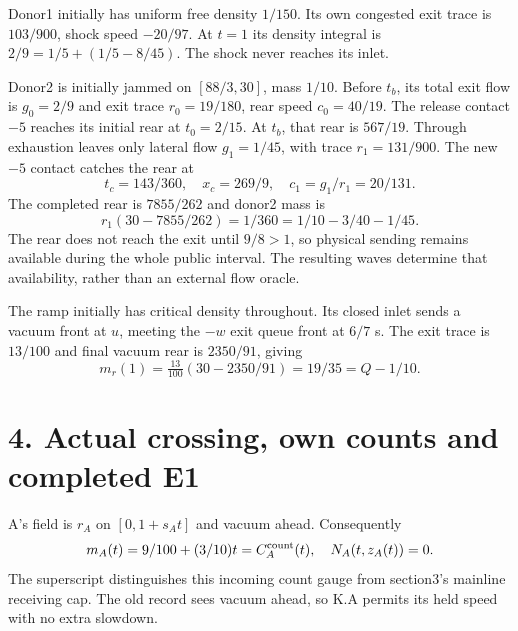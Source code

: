 \documentclass[11pt,a4paper]{article}
\begin{document}
Donor1 initially has uniform free density $1/150$. Its own congested exit
trace is $103/900$, shock speed $-20/97$. At $t=1$ its density integral is
$2/9=1/5+(1/5-8/45)$. The shock never reaches its inlet.

Donor2 is initially jammed on $[88/3,30]$, mass $1/10$. Before $t_b$, its
total exit flow is $g_0=2/9$ and exit trace $r_0=19/180$, rear speed
$c_0=40/19$. The release contact $-5$ reaches its initial rear at $t_0=2/15$.
At $t_b$, that rear is $567/19$. Through exhaustion leaves only lateral flow
$g_1=1/45$, with trace $r_1=131/900$. The new $-5$ contact catches the rear at
\begin{equation}
 t_c=143/360,\quad x_c=269/9,\quad c_1=g_1/r_1=20/131.
\end{equation}
The completed rear is $7855/262$ and donor2 mass is
\begin{equation}
 r_1(30-7855/262)=1/360=1/10-3/40-1/45.
\end{equation}
The rear does not reach the exit until $9/8>1$, so physical sending remains
available during the whole public interval. The resulting waves determine
that availability, rather than an external flow oracle.

The ramp initially has critical density throughout. Its closed inlet sends
a vacuum front at $u$, meeting the $-w$ exit queue front at $6/7$ s. The exit
trace is $13/100$ and final vacuum rear is $2350/91$, giving
\begin{equation}
 m_r(1)=\tfrac{13}{100}(30-2350/91)=19/35=Q-1/10.
\end{equation}

\newpage
\section*{4. Actual crossing, own counts and completed E1}
A's field is $r_A$ on $[0,1+s_A t]$ and vacuum ahead. Consequently
\begin{equation}
 m_A(t)=9/100+(3/10)t=C_A^{\rm count}(t),\quad
 N_A(t,z_A(t))=0.
\end{equation}
The superscript distinguishes this incoming count gauge from section3's
mainline receiving cap. The old record sees vacuum ahead, so K.A permits its
held speed with no extra slowdown.
\end{document}
